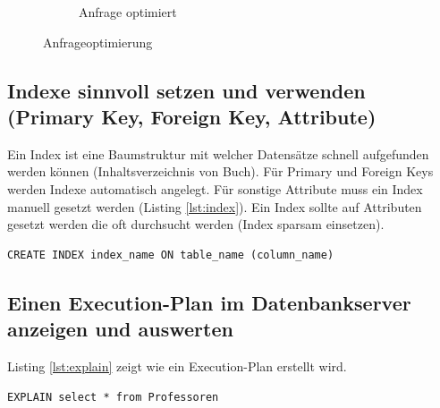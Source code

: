 \begin{figure}[h!]
\begin{subfigure}[b]{0.3\textwidth}
		\caption{Anfrage optimiert}
	\end{subfigure}
	\caption{Anfrageoptimierung}
	\label{fig:anfrageoptimierung}
\end{figure} 

\subsection{Indexe sinnvoll setzen und verwenden (Primary Key, Foreign Key, Attribute)}

Ein Index ist eine Baumstruktur mit welcher Datensätze schnell aufgefunden werden können (Inhaltsverzeichnis von Buch). Für Primary und Foreign Keys werden Indexe automatisch angelegt. Für sonstige Attribute muss ein Index manuell gesetzt werden (Listing \ref{lst:index}). Ein Index sollte auf Attributen gesetzt werden die oft durchsucht werden (Index sparsam einsetzen).

\begin{lstlisting}[caption={Index erstellen},label=lst:index]
CREATE INDEX index_name ON table_name (column_name)
\end{lstlisting}

\subsection{Einen Execution-Plan im Datenbankserver anzeigen und auswerten}

Listing \ref{lst:explain} zeigt wie ein Execution-Plan erstellt wird.

\begin{lstlisting}[caption={Execution-Plan anzeigen},label=lst:explain]
EXPLAIN select * from Professoren
\end{lstlisting}